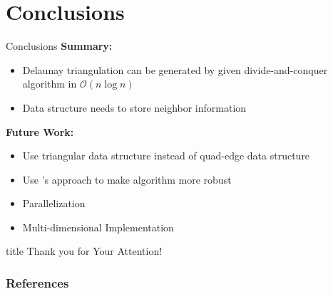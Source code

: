 \documentclass[aspectratio=169,fleqn]{beamer}
\begin{document}
\section{Conclusions}
  \begin{frame}{Conclusions}
    \onslide<+->
    \textbf{Summary:}
    \begin{itemize}
      \item<+-> Delaunay triangulation can be generated by given divide-and-conquer algorithm in $\mathscr{O}(n\log n)$
      \item<+-> Data structure needs to store neighbor information
    \end{itemize}
    \bigskip
    \onslide<+->
    \textbf{Future Work:}
    \begin{itemize}
      \item<+-> Use triangular data structure instead of quad-edge data structure
      \item<+-> Use \citeauthor{dwyer1987}'s approach to make algorithm more robust
      \item<+-> Parallelization
      \item<+-> Multi-dimensional Implementation
    \end{itemize}
  \end{frame}


\setcounter{backupcounter}{\value{framenumber}}

\begin{frame}[plain]
  \vfill
  \centering
  \begin{beamercolorbox}[sep=8pt,center,shadow=true,rounded=true]{title}
    Thank you for Your Attention!%
    \par%
  \end{beamercolorbox}
  \vfill
\end{frame}

\begin{frame}[plain]
  \frametitle{References}
  \AtNextBibliography{\tiny}
  \begin{multicols}{2}
    \nocite{*}
    \printbibliography
  \end{multicols}
\end{frame}

\setcounter{framenumber}{\value{backupcounter}}
\end{document}
